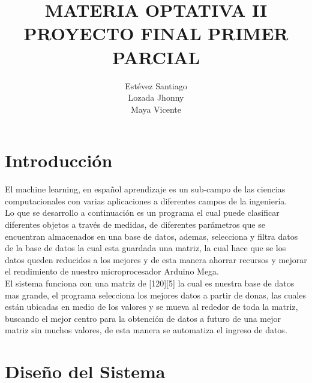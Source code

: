 \documentclass[10pt,a4paper]{article}
\begin{document}
\author{Estévez Santiago\\
		Lozada Jhonny\\
		Maya Vicente} %
\title{MATERIA OPTATIVA II\\ %
PROYECTO FINAL PRIMER PARCIAL}
\maketitle  
\section{Introducción} %
\begin{multicols}{2} %
El machine learning, en español aprendizaje  es un sub-campo de las ciencias computacionales con varias aplicaciones a diferentes campos de la ingeniería.\\ 
Lo que se desarrollo a continuación es un programa el cual puede clasificar diferentes objetos a través de medidas, de diferentes parámetros que se encuentran almacenados en una base de datos, ademas, selecciona y filtra datos de la base de datos la cual esta guardada una matriz, la cual hace que se los datos queden reducidos a los mejores y de esta manera ahorrar recursos y mejorar el rendimiento de nuestro microprocesador Arduino Mega. \\
El sistema funciona con una matriz de [120][5] la cual es nuestra base de datos mas grande, el programa selecciona los mejores datos a partir de donas, las cuales están ubicadas en medio de  los valores y se mueva al rededor de toda la matriz, buscando el mejor centro para la obtención de datos a futuro de una mejor matriz sin muchos valores, de esta manera se automatiza el ingreso de datos.\\

\end{multicols} %
\section{Diseño del Sistema}
\end{document}
